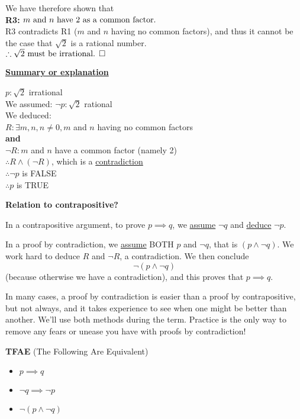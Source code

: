 \documentclass[letterpaper]{article}
\begin{document}
We have therefore shown that \\

\textbf{R3:} $ m \textnormal{ and } n \textnormal{ have 2 as a common factor.}$\\


R3 contradicts R1 ($m$ and $n$ having no common factors), and thus it cannot be the case that $\sqrt{2}$ is a rational number.\\

$\therefore \sqrt{2} \textnormal{ must be irrational. } \square$


\textbf{\underline{Summary or explanation}}\\
\begin{center}
$p: \sqrt{2}$ irrational \\
We assumed:
$\neg p: \sqrt{2}$ rational \\
We deduced: \\
$R: \exists m,n, n\neq 0, m$ and $n$ having no common factors \\
\textbf{and} \\
$\neg R: m$ and $n$ have a common factor (namely 2)\\
$\therefore R \wedge (\neg R)$, which is a \underline{contradiction}\\

 $ \therefore\neg p$ is FALSE\\
$\therefore p$ is TRUE
\end{center}

\newpage

\textbf{Relation to contrapositive?}

In a contrapositive argument, to prove $p \implies q$, we \underline{assume} $\neg q$ and \underline{deduce} $\neg p$.

In a proof by contradiction, we \underline{assume} BOTH $p$ and $\neg q$, that is $(p \land \neg q)$. We work hard to deduce $R$ and $\neg R$, a contradiction. We then conclude
$$\neg (p \land \neg q) $$
(because otherwise we have a contradiction), and this proves that
 $p \implies q$.

In many cases, a proof by contradiction is easier than a proof by contrapositive, but not always, and it takes experience to see when one might be better than another. We'll use both methods during the term. Practice is the only way to remove any fears or unease you have with proofs by contradiction!

\textbf{TFAE} (The Following Are Equivalent)
\begin{itemize}
\item $p \implies q$
\item $\neg q \implies \neg p$
\item $\neg (p \land \neg q)$
\end{itemize}
\end{document}
